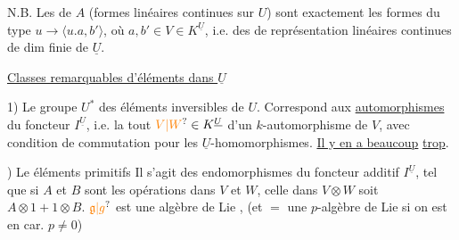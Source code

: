 N.B. Les  de $A$ (formes linéaires continues
sur $U$) sont exactement les formes du type
$u\longrightarrow\langle u.a,b'\rangle$, où $a,b'\in V\in K^{\underline U}$, i.e. des
 de représentation linéaires continues
de dim finie de $\underline U$. 

\begin{center}\shortstack{\rule{1.4cm}{0.4pt}\\[-0.9ex]\rule{1.2cm}{0.4pt}}\end{center}

\uline{Classes remarquables d'éléments dans $\underline U$}

1) Le groupe $U^*$ des éléments inversibles de $U$.
Correspond aux \uline{automorphismes} du foncteur
$I^{\underline U}$,  i.e. la  tout $\unsure{V|W}\in K^{\underline U}$
d'un  $k$-automorphisme de $V$,
avec condition de commutation pour les
$\underline U$-homomorphismes. \uline{Il y en a beaucoup}
\uline{trop}.

) Le  éléments primitifs
Il s'agit des endomorphismes du foncteur
additif $I^{\underline U}$, tel que si $A$ et $B$ sont
les opérations dans $V$ et $W$, celle dans
$V\otimes W$ soit $A\otimes1+1\otimes B$. $\unsure{\mathfrak g|g}$ est une
algèbre de Lie , (et $=$ une $p$-algèbre de
Lie si on est en car. $p\ne0$)

